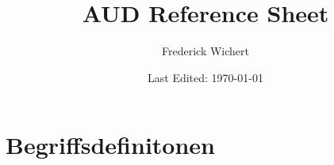 


\begin{titlepage}
  \title{AUD Reference Sheet} %
  \author{Frederick Wichert}
  \date{Last Edited: \today}
\end{titlepage}



	\maketitle
	
	\setcounter{secnumdepth}{2}
	\setcounter{tocdepth}{2}
	\tableofcontents
	
	\newpage



\section{Begriffsdefinitonen}
